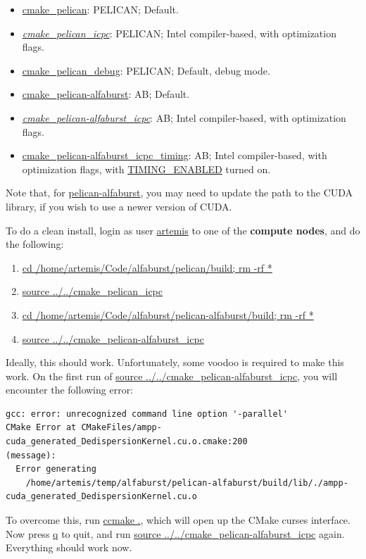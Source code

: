 \documentclass{article}
\begin{document}
\begin{itemize}
\item \url{cmake_pelican}: PELICAN; Default.
\item \emph{\url{cmake_pelican_icpc}}: PELICAN; Intel compiler-based, with
optimization flags.
\item \url{cmake_pelican_debug}: PELICAN; Default, debug mode.
\item \url{cmake_pelican-alfaburst}: AB; Default.
\item \emph{\url{cmake_pelican-alfaburst_icpc}}: AB; Intel compiler-based,
with optimization flags.
\item \url{cmake_pelican-alfaburst_icpc_timing}: AB; Intel compiler-based, with
optimization flags, with \url{TIMING_ENABLED} turned on.
\end{itemize}

Note that, for \url{pelican-alfaburst}, you may need to update the path to the
CUDA library, if you wish to use a newer version of CUDA.

To do a clean install, login as user \url{artemis} to one of the
\textbf{compute nodes}, and do the following:

\begin{enumerate}
\item \url{cd /home/artemis/Code/alfaburst/pelican/build; rm -rf *}
\item \url{source ../../cmake_pelican_icpc}
\item \url{cd /home/artemis/Code/alfaburst/pelican-alfaburst/build; rm -rf *}
\item \url{source ../../cmake_pelican-alfaburst_icpc}
\end{enumerate}

Ideally, this should work. Unfortunately, some voodoo is required to make this
work. On the first run of \url{source
../../cmake_pelican-alfaburst_icpc}, you will encounter the following error:

\small {
\begin{verbatim}
gcc: error: unrecognized command line option '-parallel'
CMake Error at CMakeFiles/ampp-cuda_generated_DedispersionKernel.cu.o.cmake:200
(message):
  Error generating
    /home/artemis/temp/alfaburst/pelican-alfaburst/build/lib/./ampp-cuda_generated_DedispersionKernel.cu.o
\end{verbatim}
}

To overcome this, run \url{ccmake .}, which will open up the CMake curses
interface. Now press \url{q} to quit, and run \url{source
../../cmake_pelican-alfaburst_icpc} again. Everything should work now.
\end{document}
